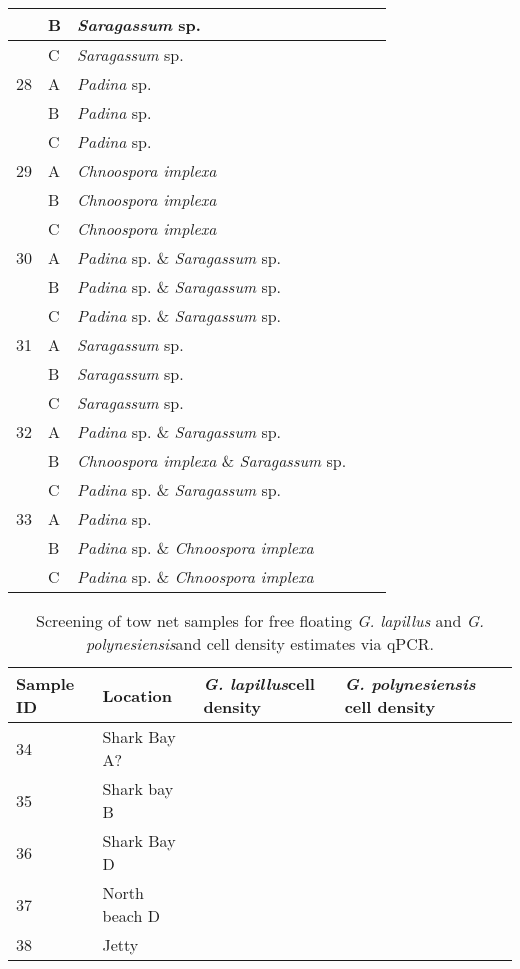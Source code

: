 \documentclass[12pt]{article}
\begin{document}
\begin{longtable}{ | p{1cm} | p{1cm} | p{3cm} | p{4cm} | p{4cm} | }
\hline
&B&\emph{Saragassum} sp.&&\\
\hline
&C&\emph{Saragassum} sp.&&\\
\hline
28&A&\emph{Padina} sp.&&\\
\hline
&B&\emph{Padina} sp.&&\\
\hline
&C&\emph{Padina} sp.&&\\
\hline
29&A&\emph{Chnoospora implexa}&&\\
\hline
&B&\emph{Chnoospora implexa}&&\\
\hline
&C&\emph{Chnoospora implexa}&&\\
\hline
30&A&\emph{Padina} sp. \& \emph{Saragassum} sp.&&\\
\hline
&B&\emph{Padina} sp. \& \emph{Saragassum} sp.&&\\
\hline
&C&\emph{Padina} sp. \& \emph{Saragassum} sp.&&\\
\hline
31&A&\emph{Saragassum} sp.&&\\
\hline
&B&\emph{Saragassum} sp.&&\\
\hline
&C&\emph{Saragassum} sp.&&\\
\hline
32&A&\emph{Padina} sp. \& \emph{Saragassum} sp.&&\\
\hline
&B&\emph{Chnoospora implexa} \& \emph{Saragassum} sp.&&\\
\hline
&C&\emph{Padina} sp. \& \emph{Saragassum} sp.&&\\
\hline
33&A&\emph{Padina} sp.&&\\
\hline
&B&\emph{Padina} sp. \& \emph{Chnoospora implexa}&&\\
\hline
&C&\emph{Padina} sp. \& \emph{Chnoospora implexa}&&\\
\hline
\end{longtable}
\FloatBarrier
\FloatBarrier
\begin{table}
\caption{Screening of tow net samples for free floating \emph{G. lapillus} and \emph{G. polynesiensis}and cell density estimates via qPCR.}
\label{tbl:NetTable}
\begin{tabular}{ | p{4cm} | p{4cm} |p{4cm} | p{4cm} | }
\hline
\textbf{Sample ID}&\textbf{Location}&\textbf{\emph{G. lapillus}cell density}&\textbf{\emph{G. polynesiensis} cell density}\\
\hline
34&Shark Bay A?&&\\
\hline
35&Shark bay B&&\\
\hline
36&Shark Bay D&&\\
\hline
37&North beach D&&\\
\hline
38&Jetty&&\\
\hline
\end{tabular}
\end{table}
\FloatBarrier
\newpage
\end{document}
